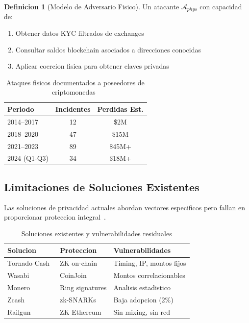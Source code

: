 \documentclass[11pt]{article}
\theoremstyle{definition}
\newtheorem{definicion}{Definicion}[section]
\theoremstyle{plain}
\theoremstyle{remark}
\begin{document}
\begin{definicion}[Modelo de Adversario Fisico]
Un atacante $\mathcal{A}_{phys}$ con capacidad de:
\begin{enumerate}
    \item Obtener datos KYC filtrados de exchanges
    \item Consultar saldos blockchain asociados a direcciones conocidas
    \item Aplicar coercion fisica para obtener claves privadas
\end{enumerate}
\end{definicion}

\begin{table}[H]
\centering
\caption{Ataques fisicos documentados a poseedores de criptomonedas~\cite{physicalbitcoin2023}}
\label{tab:attacks}
\begin{tabular}{lcc}
\toprule
\textbf{Periodo} & \textbf{Incidentes} & \textbf{Perdidas Est.} \\
\midrule
2014--2017 & 12 & \$2M \\
2018--2020 & 47 & \$15M \\
2021--2023 & 89 & \$45M+ \\
2024 (Q1-Q3) & 34 & \$18M+ \\
\bottomrule
\end{tabular}
\end{table}

\subsection{Limitaciones de Soluciones Existentes}

Las soluciones de privacidad actuales abordan vectores especificos pero fallan en proporcionar proteccion integral~\cite{kumar2017traceability, biryukov2019deanonymization}.

\begin{table}[H]
\centering
\caption{Soluciones existentes y vulnerabilidades residuales}
\label{tab:existing}
\begin{tabular}{lll}
\toprule
\textbf{Solucion} & \textbf{Proteccion} & \textbf{Vulnerabilidades} \\
\midrule
Tornado Cash~\cite{pertsev2019tornado} & ZK on-chain & Timing, IP, montos fijos \\
Wasabi~\cite{nopara2018wasabi} & CoinJoin & Montos correlacionables \\
Monero~\cite{vansaberhagen2013cryptonote} & Ring signatures & Analisis estadistico \\
Zcash~\cite{hopwood2016zcash} & zk-SNARKs & Baja adopcion (2\%) \\
Railgun~\cite{railgun2021} & ZK Ethereum & Sin mixing, sin red \\
\bottomrule
\end{tabular}
\end{table}
\end{document}
